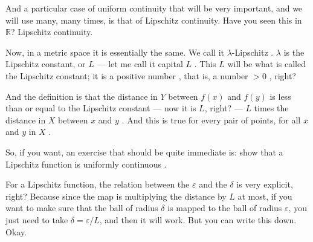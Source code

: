 \begin{speech}[00:09:32 - 00:11:08]
And a particular case of uniform continuity that will be very important, and we will use many, many times, is that of Lipschitz continuity. Have you seen this in $\mathbb{R}$? Lipschitz continuity.

Now, in a metric space it is essentially the same. We call it $\lambda$-Lipschitz . $\lambda$ is the Lipschitz constant, or $L$ --- let me call it capital $L$ . This $L$ will be what is called the Lipschitz constant; it is a positive number , that is, a number $> 0$ , right?

And the definition is that the distance in $Y$ between $f(x)$ and $f(y)$  is less than or equal to the Lipschitz constant --- now it is $L$, right? --- $L$ times the distance in $X$ between $x$ and $y$ . And this is true for every pair of points, for all $x$ and $y$ in $X$ .
\end{speech}

\begin{speech}[00:11:08 - 00:12:15]
So, if you want, an exercise that should be quite immediate is: show that a Lipschitz function is uniformly continuous .

For a Lipschitz function, the relation between the $\varepsilon$ and the $\delta$ is very explicit, right? Because since the map is multiplying the distance by $L$ at most, if you want to make sure that the ball of radius $\delta$ is mapped to the ball of radius $\varepsilon$, you just need to take $\delta = \varepsilon / L$, and then it will work. But you can write this down. Okay.
\end{speech}

